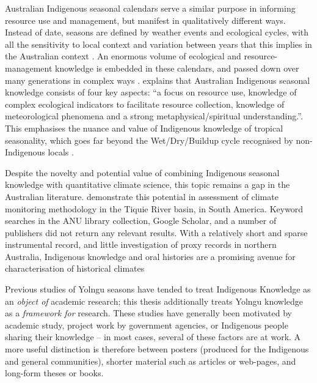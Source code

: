 Australian Indigenous seasonal calendars serve a similar purpose in informing
resource use and management, but manifest in qualitatively different ways.
Instead of date, seasons are defined by weather events and ecological cycles,
with all the sensitivity to local context and variation between years that
this implies in the Australian context \citep{davis1989}.  An enormous volume of ecological and
resource-management knowledge is embedded in these calendars, and passed
down over many generations in complex ways \citep{barber2005}.
%
\citet{woodward2012b} explains that Australian Indigenous seasonal knowledge
consists of four key aspects: ``a focus on resource use, knowledge of complex
ecological indicators to facilitate resource collection, knowledge of
meteorological phenomena and a strong metaphysical/spiritual understanding.''.
This emphasises the nuance and value of Indigenous knowledge of tropical
seasonality, which goes far beyond the Wet/Dry/Buildup cycle recognised
by non-Indigenous locals \citep{kingsley2003}.


Despite the novelty and potential value of combining Indigenous seasonal
knowledge with quantitative climate science, this topic remains a gap
in the Australian literature.  \citet{cochran2015} demonstrate this potential
in assessment of climate monitoring methodology in the Tiquie River basin,
in South America.  Keyword searches in the ANU library collection, Google
Scholar, and a number of publishers did not return any relevant results.
With a relatively short and sparse instrumental record, and little investigation
of proxy records in northern Australia, Indigenous knowledge and oral histories
are a promising avenue for characterisation of historical climates


Previous studies of Yolngu seasons have tended to treat Indigenous Knowledge
as an \emph{object of} academic research; this thesis additionally treats
Yolngu knowledge as a \emph{framework for} research.  These studies have generally
been motivated by academic study, project work by government agencies, or
Indigenous people sharing their knowledge -- in most cases, several of these
factors are at work.  A more useful distinction is therefore between posters
(produced for the Indigenous and general communities), shorter material such
as articles or web-pages, and long-form theses or books.

